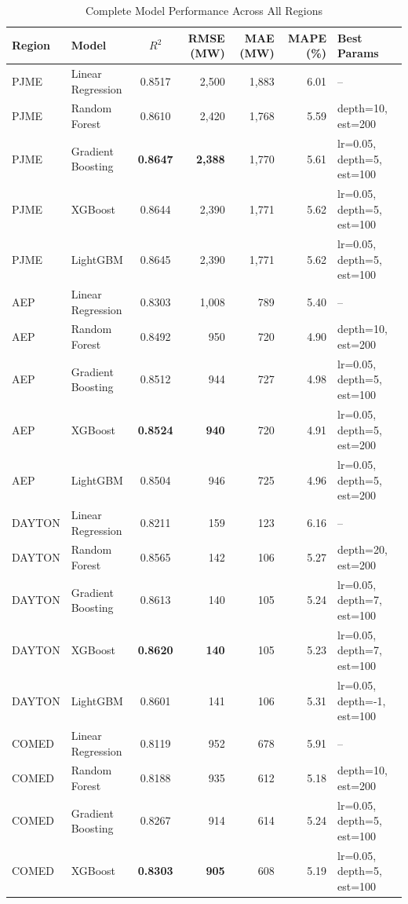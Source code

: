 \documentclass[conference]{IEEEtran}
\begin{document}
\begin{table}[t]
\centering
\caption{Complete Model Performance Across All Regions}
\begin{tabular}{|l|l|c|r|r|r|l|}
\hline
\textbf{Region} & \textbf{Model} & \textbf{$R^{2}$} & \textbf{RMSE (MW)} & \textbf{MAE (MW)} & \textbf{MAPE (\%)} & \textbf{Best Params} \\
\hline
PJME & Linear Regression & 0.8517 & 2,500 & 1,883 & 6.01 & -- \\
PJME & Random Forest & 0.8610 & 2,420 & 1,768 & 5.59 & depth=10, est=200 \\
PJME & Gradient Boosting & \textbf{0.8647} & \textbf{2,388} & 1,770 & 5.61 & lr=0.05, depth=5, est=100 \\
PJME & XGBoost & 0.8644 & 2,390 & 1,771 & 5.62 & lr=0.05, depth=5, est=100 \\
PJME & LightGBM & 0.8645 & 2,390 & 1,771 & 5.62 & lr=0.05, depth=5, est=100 \\
\hline
AEP & Linear Regression & 0.8303 & 1,008 & 789 & 5.40 & -- \\
AEP & Random Forest & 0.8492 & 950 & 720 & 4.90 & depth=10, est=200 \\
AEP & Gradient Boosting & 0.8512 & 944 & 727 & 4.98 & lr=0.05, depth=5, est=100 \\
AEP & XGBoost & \textbf{0.8524} & \textbf{940} & 720 & 4.91 & lr=0.05, depth=5, est=200 \\
AEP & LightGBM & 0.8504 & 946 & 725 & 4.96 & lr=0.05, depth=5, est=200 \\
\hline
DAYTON & Linear Regression & 0.8211 & 159 & 123 & 6.16 & -- \\
DAYTON & Random Forest & 0.8565 & 142 & 106 & 5.27 & depth=20, est=200 \\
DAYTON & Gradient Boosting & 0.8613 & 140 & 105 & 5.24 & lr=0.05, depth=7, est=100 \\
DAYTON & XGBoost & \textbf{0.8620} & \textbf{140} & 105 & 5.23 & lr=0.05, depth=7, est=100 \\
DAYTON & LightGBM & 0.8601 & 141 & 106 & 5.31 & lr=0.05, depth=-1, est=100 \\
\hline
COMED & Linear Regression & 0.8119 & 952 & 678 & 5.91 & -- \\
COMED & Random Forest & 0.8188 & 935 & 612 & 5.18 & depth=10, est=200 \\
COMED & Gradient Boosting & 0.8267 & 914 & 614 & 5.24 & lr=0.05, depth=5, est=100 \\
COMED & XGBoost & \textbf{0.8303} & \textbf{905} & 608 & 5.19 & lr=0.05, depth=5, est=100 \\

\end{tabular}
\end{table}
\end{document}
